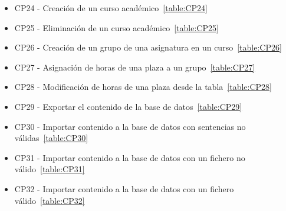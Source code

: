 \begin{itemize}
\item CP24 - Creación de un curso académico~\ref{table:CP24}
\item CP25 - Eliminación de un curso académico~\ref{table:CP25}
\item CP26 - Creación de un grupo de una asignatura en un curso~\ref{table:CP26}
\item CP27 - Asignación de horas de una plaza a un grupo~\ref{table:CP27}
\item CP28 - Modificación de horas de una plaza desde la tabla~\ref{table:CP28}
\item CP29 - Exportar el contenido de la base de datos~\ref{table:CP29}
\item CP30 - Importar contenido a la base de datos con sentencias no válidas~\ref{table:CP30}
\item CP31 - Importar contenido a la base de datos con un fichero no válido~\ref{table:CP31}
\item CP32 - Importar contenido a la base de datos con un fichero válido~\ref{table:CP32}
\end{itemize}

